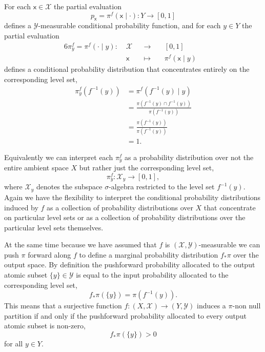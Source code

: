 \documentclass[
  letterpaper,
  DIV=11,
  numbers=noendperiod]{scrartcl}
\begin{document}
For each \(\mathsf{x} \in \mathcal{X}\) the partial evaluation \[
p_{\mathsf{x}} = \pi^{f} ( \mathsf{x} \mid \cdot )
: Y \rightarrow [0, 1]
\] defines a \(\mathcal{Y}\)-measurable conditional probability
function, and for each \(y \in Y\) the partial evaluation
\begin{alignat*}{6}
\pi^{f}_{y} = \pi^{f} ( \cdot \mid y )
:\; &\mathcal{X}& &\rightarrow& \; &[0, 1]&
\\
&\mathsf{x}& &\mapsto& &\pi^{f} ( \mathsf{x} \mid y )  &
\end{alignat*} defines a conditional probability distribution that
concentrates entirely on the corresponding level set, \begin{align*}
\pi^{f}_{y}( f^{-1}(y) )
&=
\pi^{f}( f^{-1}(y) \mid y )
\\
&=
\frac{ \pi(f^{-1}(y) \cap f^{-1}(y)) }{ \pi(f^{-1}(y)) }
\\
&=
\frac{ \pi(f^{-1}(y) ) }{ \pi(f^{-1}(y)) }
\\
&=
1.
\end{align*}

Equivalently we can interpret each \(\pi^{f}_{y}\) as a probability
distribution over not the entire ambient space \(X\) but rather just the
corresponding level set, \[
\pi^{f}_{y} : \mathcal{X}_{y} \rightarrow [0, 1],
\] where \(\mathcal{X}_{y}\) denotes the subspace \(\sigma\)-algebra
restricted to the level set \(f^{-1}(y)\). Again we have the flexibility
to interpret the conditional probability distributions induced by \(f\)
as a collection of probability distributions over \(X\) that concentrate
on particular level sets or as a collection of probability distributions
over the particular level sets themselves.

At the same time because we have assumed that \(f\) is
\((\mathcal{X}, \mathcal{Y})\)-measurable we can push \(\pi\) forward
along \(f\) to define a marginal probability distribution \(f_{*} \pi\)
over the output space. By definition the pushforward probability
allocated to the output atomic subset \(\{ y \} \in \mathcal{Y}\) is
equal to the input probability allocated to the corresponding level set,
\[
f_{*} \pi( \{ y \} ) = \pi ( f^{-1}(y) ).
\] This means that a surjective function
\(f : (X, \mathcal{X}) \rightarrow (Y, \mathcal{Y})\) induces a
\(\pi\)-non null partition if and only if the pushforward probability
allocated to every output atomic subset is non-zero, \[
f_{*} \pi( \{ y \} ) > 0
\] for all \(y \in Y\).
\end{document}
